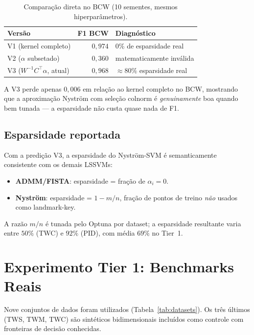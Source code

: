 \documentclass[12pt,a4paper]{article}
\begin{document}
\begin{table}[H]
\centering
\caption{Comparação direta no BCW (10 sementes, mesmos hiperparâmetros).}
\label{tab:nystrom_audit}
\begin{tabular}{lrl}
\toprule
\textbf{Versão} & \textbf{F1 BCW} & \textbf{Diagnóstico} \\
\midrule
V1 (kernel completo)        & $0{,}974$ & 0\% de esparsidade real \\
V2 ($\alpha$ subsetado)      & $0{,}360$ & matematicamente inválida \\
V3 ($W^{-1}C^\top\alpha$, atual) & $0{,}968$ & $\approx 80\%$ esparsidade real \\
\bottomrule
\end{tabular}
\end{table}

A V3 perde apenas $0{,}006$ em relação ao kernel completo no BCW, mostrando
que a aproximação Nyström com seleção colnorm é \emph{genuinamente} boa
quando bem tunada --- a esparsidade não custa quase nada de F1.

\subsection{Esparsidade reportada}

Com a predição V3, a esparsidade do Nyström-SVM é semanticamente consistente
com os demais LSSVMs:
\begin{itemize}
  \item \textbf{ADMM/FISTA}: esparsidade = fração de $\alpha_i = 0$.
  \item \textbf{Nyström}: esparsidade = $1 - m/n$, fração de pontos de treino
        \emph{não} usados como landmark-key.
\end{itemize}
A razão $m/n$ é tunada pelo Optuna por dataset; a esparsidade resultante varia
entre $50\%$ (TWC) e $92\%$ (PID), com média $69\%$ no Tier~1.

\section{Experimento Tier 1: Benchmarks Reais}
\label{sec:tier1}

Nove conjuntos de dados foram utilizados (Tabela~\ref{tab:datasets}).
Os três últimos (TWS, TWM, TWC) são sintéticos bidimensionais incluídos como
controle com fronteiras de decisão conhecidas.
\end{document}
